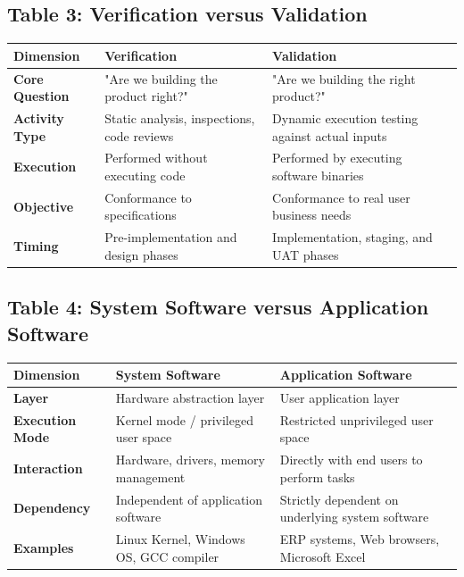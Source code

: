 \subsection*{Table 3: Verification versus Validation}
\begin{center}
\small
\begin{tabularx}{\textwidth}{lXX}
\toprule
\textbf{Dimension} & \textbf{Verification} & \textbf{Validation} \\
\midrule
\textbf{Core Question} & "Are we building the product right?" & "Are we building the right product?" \\
\textbf{Activity Type} & Static analysis, inspections, code reviews & Dynamic execution testing against actual inputs \\
\textbf{Execution} & Performed without executing code & Performed by executing software binaries \\
\textbf{Objective} & Conformance to specifications & Conformance to real user business needs \\
\textbf{Timing} & Pre-implementation and design phases & Implementation, staging, and UAT phases \\
\bottomrule
\end{tabularx}
\end{center}

\subsection*{Table 4: System Software versus Application Software}
\begin{center}
\small
\begin{tabularx}{\textwidth}{lXX}
\toprule
\textbf{Dimension} & \textbf{System Software} & \textbf{Application Software} \\
\midrule
\textbf{Layer} & Hardware abstraction layer & User application layer \\
\textbf{Execution Mode} & Kernel mode / privileged user space & Restricted unprivileged user space \\
\textbf{Interaction} & Hardware, drivers, memory management & Directly with end users to perform tasks \\
\textbf{Dependency} & Independent of application software & Strictly dependent on underlying system software \\
\textbf{Examples} & Linux Kernel, Windows OS, GCC compiler & ERP systems, Web browsers, Microsoft Excel \\
\bottomrule
\end{tabularx}
\end{center}

